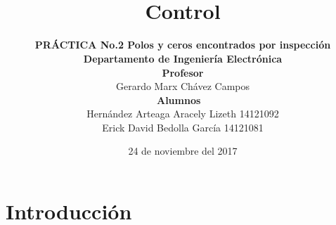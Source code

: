 \documentclass[12pt,letterpaper]{IEEEtran}
\begin{document}
	\title{ \\ \sc\textbf{Control}}
	\date{24 de noviembre del 2017}
	\author{ \textbf{PRÁCTICA No.2 Polos y ceros encontrados por inspección} \\\textbf{ Departamento de Ingeniería Electrónica} \\\textbf{Profesor} \\Gerardo Marx Chávez Campos \\ \textbf{Alumnos}  \\ Hernández Arteaga Aracely Lizeth 14121092 \\ Erick David Bedolla García 14121081}
	\maketitle
	\section{Introducción}
	
\end{document}
